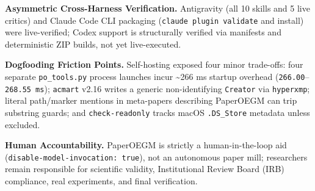 \textbf{Asymmetric Cross-Harness Verification.} Antigravity (all 10 skills and 5 live critics) and Claude Code CLI packaging (\texttt{claude\ plugin\ validate} and install) were live-verified; Codex support is structurally verified via manifests and deterministic ZIP builds, not yet live-executed.

\textbf{Dogfooding Friction Points.} Self-hosting exposed four minor trade-offs: four separate \texttt{po\_\allowbreak{}tools.\allowbreak{}py} process launches incur \textasciitilde266 ms startup overhead (\texttt{266.00}--\texttt{268.55\ ms}); \texttt{acmart} v2.16 writes a generic non-identifying \texttt{Creator} via \texttt{hyperxmp}; literal path/marker mentions in meta-papers describing PaperOEGM can trip substring guards; and \texttt{check-readonly} tracks macOS \texttt{.DS\_\allowbreak{}Store} metadata unless excluded.

\textbf{Human Accountability.} PaperOEGM is strictly a human-in-the-loop aid (\texttt{disable-model-invocation:\ true}), not an autonomous paper mill; researchers remain responsible for scientific validity, Institutional Review Board (IRB) compliance, real experiments, and final verification.
